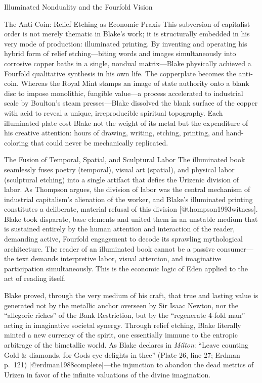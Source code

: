 \documentclass[
  ignorenonframetext,
]{beamer}
\begin{document}
\begin{frame}{Illuminated Nonduality and the Fourfold Vision}
\begin{block}{The Anti-Coin: Relief Etching as Economic Praxis}
\protect{}\label{the-anti-coin-relief-etching-as-economic-praxis}
This subversion of capitalist order is not merely thematic in Blake's
work; it is structurally embedded in his very mode of production:
illuminated printing. By inventing and operating his hybrid form of
relief etching---biting words and images simultaneously into corrosive
copper baths in a single, nondual matrix---Blake physically achieved a
Fourfold qualitative synthesis in his own life. The copperplate becomes
the anti-coin. Whereas the Royal Mint stamps an image of state authority
onto a blank disc to impose monolithic, fungible value---a process
accelerated to industrial scale by Boulton's steam presses---Blake
dissolved the blank surface of the copper with acid to reveal a unique,
irreproducible spiritual topography. Each illuminated plate cost Blake
not the weight of its metal but the expenditure of his creative
attention: hours of drawing, writing, etching, printing, and
hand-coloring that could never be mechanically replicated.
\end{block}

\begin{block}{The Fusion of Temporal, Spatial, and Sculptural Labor}
\protect{}\label{the-fusion-of-temporal-spatial-and-sculptural-labor}
The illuminated book seamlessly fuses poetry (temporal), visual art
(spatial), and physical labor (sculptural etching) into a single
artifact that defies the Urizenic division of labor. As Thompson argues,
the division of labor was the central mechanism of industrial
capitalism's alienation of the worker, and Blake's illuminated printing
constitutes a deliberate, material refusal of this division
{[}@thompson1993witness{]}. Blake took disparate, base elements and
united them in an unstable medium that is sustained entirely by the
human attention and interaction of the reader, demanding active,
Fourfold engagement to decode its sprawling mythological architecture.
The reader of an illuminated book cannot be a passive consumer---the
text demands interpretive labor, visual attention, and imaginative
participation simultaneously. This is the economic logic of Eden applied
to the act of reading itself.

Blake proved, through the very medium of his craft, that true and
lasting value is generated not by the metallic anchor overseen by Sir
Isaac Newton, nor the ``allegoric riches'' of the Bank Restriction, but
by the ``regenerate 4-fold man'' acting in imaginative societal synergy.
Through relief etching, Blake literally minted a new currency of the
spirit, one essentially immune to the entropic arbitrage of the
bimetallic world. As Blake declares in \emph{Milton}: ``Leave counting
Gold \& diamonds, for Gods eye delights in thee'' (Plate 26, line 27;
Erdman p.~121) {[}@erdman1988complete{]}---the injunction to abandon the
dead metrics of Urizen in favor of the infinite valuations of the divine
imagination.
\end{block}
\end{frame}
\end{document}
